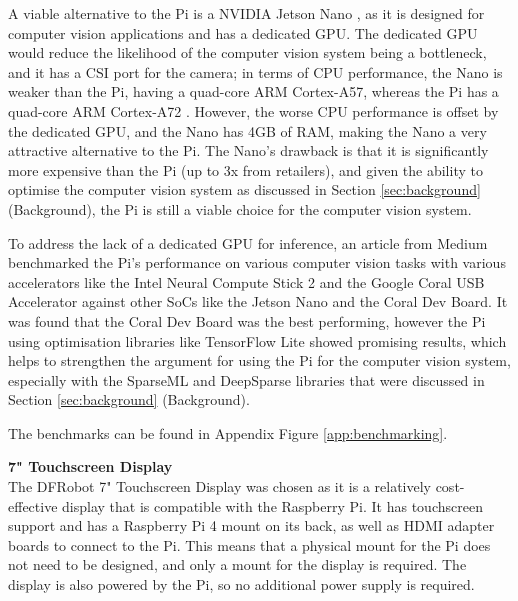 A viable alternative to the Pi is a NVIDIA Jetson Nano \cite{jetsonnano}, as it is designed for computer vision applications and has a dedicated GPU. The dedicated GPU
would reduce the likelihood of the computer vision system being a bottleneck, and it has a CSI port for the camera; in terms of CPU performance, the Nano is weaker than the Pi,
having a quad-core ARM Cortex-A57, whereas the Pi has a quad-core ARM Cortex-A72 \cite{pi4}. However, the worse CPU performance is offset by the dedicated GPU, and the Nano has 4GB of RAM, 
making the Nano a very attractive alternative to the Pi. The Nano's drawback is that it is significantly more expensive than the Pi (up to 3x from retailers), and
given the ability to optimise the computer vision system as discussed in Section \ref{sec:background} (Background), the Pi is still
a viable choice for the computer vision system.

To address the lack of a dedicated GPU for inference, an article from Medium \cite{benchmarks} benchmarked the Pi's performance on various computer vision tasks with 
various accelerators like the Intel Neural Compute Stick 2 and the Google Coral USB Accelerator against other SoCs like the Jetson Nano and the Coral Dev Board. 
It was found that the Coral Dev Board was the best performing, however the Pi using optimisation libraries like TensorFlow Lite showed  promising results, which
helps to strengthen the argument for using the Pi for the computer vision system, especially with the SparseML and DeepSparse libraries that were discussed in Section \ref{sec:background} (Background).

The benchmarks can be found in Appendix Figure \ref{app:benchmarking}.

\vspace{1em}
\noindent
\textbf{7" Touchscreen Display} \\
The DFRobot 7" Touchscreen Display was chosen as it is a relatively cost-effective display that is compatible with the Raspberry Pi.
It has touchscreen support and has a Raspberry Pi 4 mount on its back, as well as HDMI adapter boards to connect to the Pi.
This means that a physical mount for the Pi does not need to be designed, and only a mount for the display is required. The display is also powered by the Pi,
so no additional power supply is required. 

